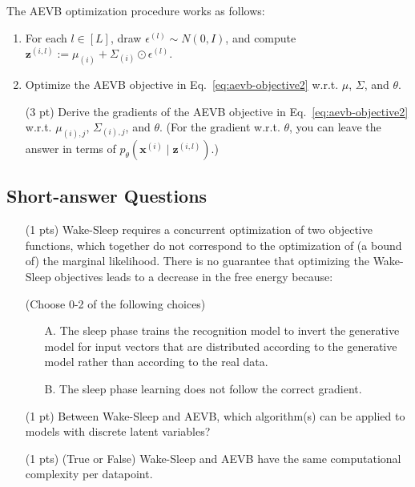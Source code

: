 The AEVB optimization procedure works as follows:
    \begin{enumerate}
        \item For each $l \in [L]$, draw $\epsilon^{(l)} \sim N(0, I)$, and compute $\mathbf{z}^{(i,l)} := \mu_{(i)} + \Sigma_{(i)} \odot \epsilon^{(l)}$. 
        \item Optimize the AEVB objective in Eq.~\eqref{eq:aevb-objective2} w.r.t. $\mu$, $\Sigma$, and $\theta$.
    \end{enumerate}

\begin{itemize}
    \item[(3 pt)] Derive the gradients of the AEVB objective in Eq.~\eqref{eq:aevb-objective2} w.r.t. $\mu_{(i),j}$, $\Sigma_{(i),j}$, and $\theta$. (For the gradient w.r.t. $\theta$, you can leave the answer in terms of $p_\theta(\mathbf{x}^{(i)} \mid \mathbf{z}^{(i, l)})$.)


\begin{solution}
\end{solution}

\end{itemize}


\subsection{Short-answer Questions}\label{section:short-questions}

\begin{itemize}
\item[(1 pts)] Wake-Sleep requires a concurrent optimization of two objective functions, which together do not correspond to the optimization of (a bound of) the marginal likelihood. There is no guarantee that optimizing the Wake-Sleep objectives leads to a decrease in the free energy because:

(Choose 0-2 of the following choices)
\begin{enumerate}
    \item[A.] The sleep phase trains the recognition model to invert the generative model for input vectors that are distributed according to the generative model rather than according to the real data.
    \item[B.] The sleep phase learning does not follow the correct gradient.
\end{enumerate}

\begin{solution}
\end{solution}

\item[(1 pt)] Between Wake-Sleep and AEVB, which algorithm(s) can be applied to models with discrete latent variables?
\begin{solution}
\end{solution}

\item[(1 pts)] (True or False) Wake-Sleep and AEVB have the same computational complexity per datapoint.
\begin{solution}
\end{solution}
\end{itemize}

